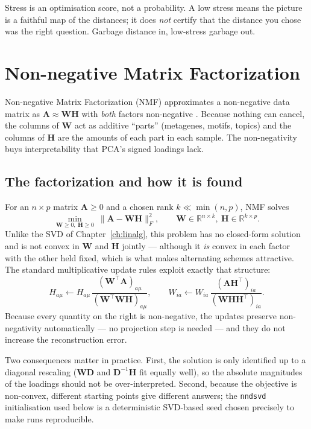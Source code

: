 \documentclass[11pt,oneside]{book}
\newcommand{\code}[1]{\texttt{#1}}
\begin{document}
\begin{keybox}
Stress is an optimisation score, not a probability. A low stress means the picture is a
faithful map of the distances; it does \emph{not} certify that the distance you chose was
the right question. Garbage distance in, low-stress garbage out.
\end{keybox}

\chapter{Non-negative Matrix Factorization}
\label{ch:nmf}
Non-negative Matrix Factorization (NMF) approximates a non-negative data matrix as
$\mathbf{A}\approx\mathbf{W}\mathbf{H}$ with \emph{both} factors non-negative
\cite{Lee_1999}. Because nothing can cancel, the columns of $\mathbf{W}$ act as additive
``parts'' (metagenes, motifs, topics) and the columns of $\mathbf{H}$ are the amounts of
each part in each sample. The non-negativity buys interpretability that PCA's signed
loadings lack.

\section{The factorization and how it is found}
For an $n\times p$ matrix $\mathbf{A}\ge 0$ and a chosen rank $k\ll\min(n,p)$, NMF solves
\[
  \min_{\mathbf{W}\ge 0,\ \mathbf{H}\ge 0}\ \lVert \mathbf{A}-\mathbf{W}\mathbf{H}\rVert_F^{2},
  \qquad \mathbf{W}\in\mathbb{R}^{n\times k},\ \mathbf{H}\in\mathbb{R}^{k\times p}.
\]
Unlike the SVD of Chapter~\ref{ch:linalg}, this problem has no closed-form solution and is not convex in
$\mathbf{W}$ and $\mathbf{H}$ jointly — although it \emph{is} convex in each factor with the
other held fixed, which is what makes alternating schemes attractive. The standard
multiplicative update rules exploit exactly that structure:
\[
  H_{a\mu}\leftarrow H_{a\mu}\,\frac{(\mathbf{W}^{\!\top}\mathbf{A})_{a\mu}}{(\mathbf{W}^{\!\top}\mathbf{W}\mathbf{H})_{a\mu}},
  \qquad
  W_{ia}\leftarrow W_{ia}\,\frac{(\mathbf{A}\mathbf{H}^{\!\top})_{ia}}{(\mathbf{W}\mathbf{H}\mathbf{H}^{\!\top})_{ia}} .
\]
Because every quantity on the right is non-negative, the updates preserve non-negativity
automatically — no projection step is needed — and they do not increase the reconstruction
error.

Two consequences matter in practice. First, the solution is only identified up to a
diagonal rescaling ($\mathbf{W}\mathbf{D}$ and $\mathbf{D}^{-1}\mathbf{H}$ fit equally well),
so the absolute magnitudes of the loadings should not be over-interpreted. Second, because
the objective is non-convex, different starting points give different answers; the
\code{nndsvd} initialisation used below is a deterministic SVD-based seed chosen precisely
to make runs reproducible.
\end{document}
